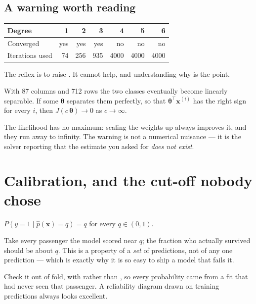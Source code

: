\documentclass[11pt,a4paper]{article}
\begin{document}
\subsection{A warning worth reading}

\begin{center}
\small
\begin{tabular}{lrrrrrr}
\toprule
\textbf{Degree} & 1 & 2 & 3 & 4 & 5 & 6 \\
\midrule
Converged        & yes & yes & yes & no & no & no \\
Iterations used  & 74 & 256 & 935 & 4000 & 4000 & 4000 \\
\bottomrule
\end{tabular}
\end{center}

The reflex is to raise . It cannot help, and understanding why
is the point.

\begin{failbox}[title={Failure condition --- under separation the minimiser does not exist}]
With 87 columns and 712 rows the two classes eventually become linearly
separable. If some $\boldsymbol\theta$ separates them perfectly, so that
$\boldsymbol\theta^{\intercal}\mathbf{x}^{(i)}$ has the right sign for every
$i$, then $J(c\,\boldsymbol\theta) \to 0$ as $c \to \infty$.

The likelihood has no maximum: scaling the weights up always improves it, and
they run away to infinity. The warning is not a numerical nuisance --- it is
the solver reporting that the estimate you asked for \emph{does not exist}.
\end{failbox}

\section{Calibration, and the cut-off nobody chose}

\begin{definition}[Calibration]
$P(y = 1 \mid \hat p(\mathbf{x}) = q) = q$ for every $q \in (0,1)$.
\end{definition}

Take every passenger the model scored near $q$; the fraction who actually
survived should be about $q$. This is a property of a \emph{set} of
predictions, not of any one prediction --- which is exactly why it is so easy
to ship a model that fails it.

Check it out of fold, with  rather than
, so every probability came from a fit that had never seen that
passenger. A reliability diagram drawn on training predictions always looks
excellent.
\end{document}

